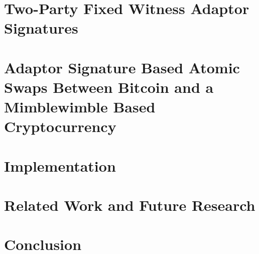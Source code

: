 \documentclass[draft,final]{vutinfth} %
\theoremstyle{definition}
\begin{document}
\chapter{Two-Party Fixed Witness Adaptor Signatures}\label{ch:fixedwitnesssignatures}


\chapter{Adaptor Signature Based Atomic Swaps Between Bitcoin and a Mimblewimble Based Cryptocurrency}\label{ch:atomicswap}


\chapter{Implementation}\label{ch:implementation}


\chapter{Related Work and Future Research}\label{chp:futurework}


\chapter{Conclusion}\label{chp:conclusion}


\backmatter

\listoffigures %

\cleardoublepage %


\printindex

\printglossaries



\end{document}
